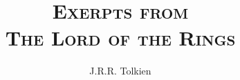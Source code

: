 \thispagestyle{empty}
\title {
  \textsc{\Huge Exerpts from \\ The Lord of the Rings}
  }
\author{J.R.R. Tolkien}
\date{}
\maketitle
